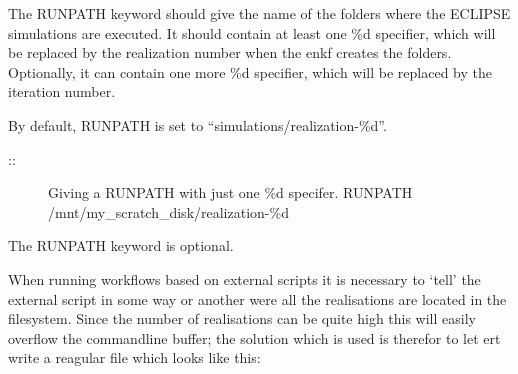 \documentclass[a4paper,10pt,english]{sphinxmanual}
\begin{document}
\begin{sphinxShadowBox}

The RUNPATH keyword should give the name of the folders where the ECLIPSE
simulations are executed. It should contain at least one \%d specifier, which
will be replaced by the realization number when the enkf creates the folders.
Optionally, it can contain one more \%d specifier, which will be replaced by
the iteration number.

By default, RUNPATH is set to “simulations/realization-\%d”.

\begin{description}
\item[{::}] \leavevmode
\textendash{} Giving a RUNPATH with just one \%d specifer.
RUNPATH /mnt/my\_scratch\_disk/realization-\%d

\end{description}


%
\begin{sphinxVerbatim}[commandchars=\\\{\}]
       
 
\end{sphinxVerbatim}

The RUNPATH keyword is optional.
\end{sphinxShadowBox}
\label{\detokenize{keywords/index:runpath-file}}
When running workflows based on external scripts it is necessary to ‘tell’ the
external script in some way or another were all the realisations are located in
the filesystem. Since the number of realisations can be quite high this will
easily overflow the commandline buffer; the solution which is used is therefor
to let ert write a reagular file which looks like this:

%
\begin{sphinxVerbatim}[commandchars=\\\{\}]
         
         
         
\end{sphinxVerbatim}
\end{document}
